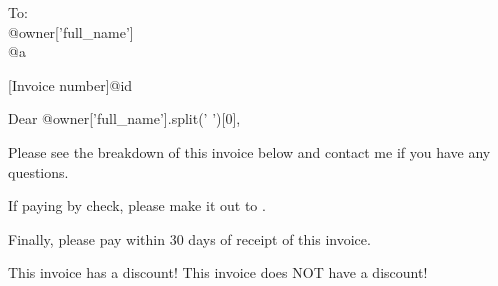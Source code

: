 \documentclass[paper=a4,fontsize=11pt,DIV=12]{scrlttr2}
\begin{document}
    \begin{letter}{To:\\
			@{owner['full_name']}\\
@{a}\\
		}
		
		
		[Invoice number]{@{id}}
		
		\opening{Dear @{owner['full_name'].split(' ')[0]},}
		
        Please see the breakdown of this invoice below and contact me if you have any questions. 
        
        If paying by check, please make it out to .
        
        Finally, please pay within 30 days of receipt of this invoice.




{}
{  }

        
        {This invoice has a discount!}
        {This invoice does NOT have a discount!}





\end{letter}
\end{document}
